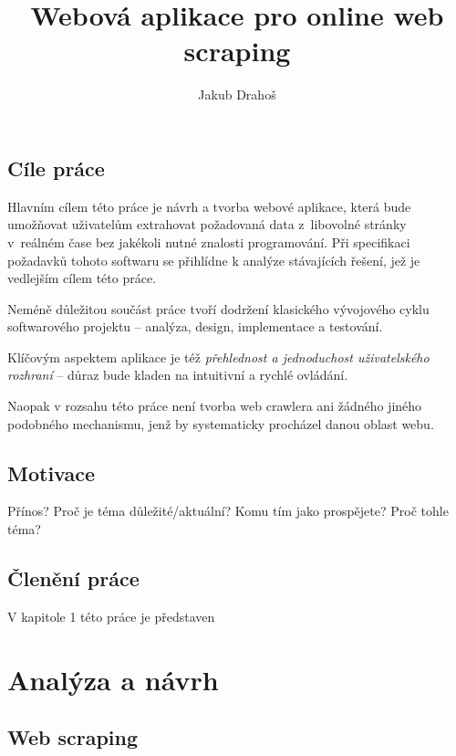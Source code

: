 \documentclass[thesis=B,czech]{FITthesis}[2012/06/26]
\title{Webová aplikace pro online web scraping}
\author{Jakub Drahoš} %
\begin{document}

\begin{introduction}
	\section*{Cíle práce}
	Hlavním cílem této práce je návrh a tvorba webové aplikace, která bude umožňovat uživatelům extrahovat požadovaná data z~libovolné stránky v~reálném čase bez jakékoli nutné znalosti programování. Při specifikaci požadavků tohoto softwaru se přihlídne k analýze stávajících řešení, jež je vedlejším cílem této práce.
	
	Neméně důležitou součást práce tvoří dodržení klasického vývojového cyklu softwarového projektu -- analýza, design, implementace a testování.
	
	Klíčovým aspektem aplikace je též \emph{přehlednost a jednoduchost uživatelského rozhraní} -- důraz bude kladen na intuitivní a rychlé ovládání.
	
	Naopak v rozsahu této práce není tvorba web crawlera ani žádného jiného podobného mechanismu, jenž by systematicky procházel danou oblast webu.
	
	\section*{Motivace}
	Přínos? Proč je téma důležité/aktuální? Komu tím jako prospějete? Proč tohle téma?
	
	\section*{Členění práce}
	V kapitole 1 této práce je představen 
\end{introduction}




\chapter{Analýza a návrh}


\section{Web scraping}
\end{document}
